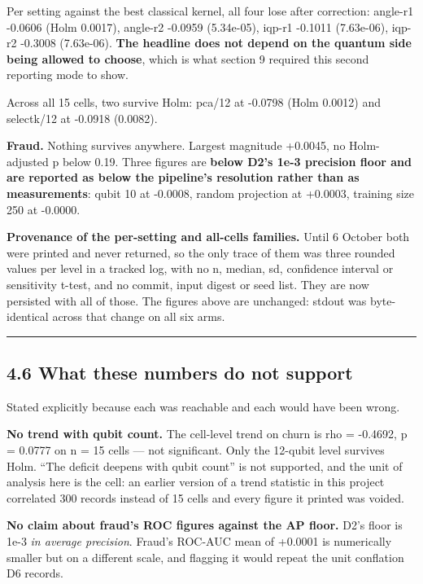 \documentclass[
  10pt,
]{article}
\begin{document}
Per setting against the best classical kernel, all four lose after
correction: angle-r1 -0.0606 (Holm 0.0017), angle-r2 -0.0959 (5.34e-05),
iqp-r1 -0.1011 (7.63e-06), iqp-r2 -0.3008 (7.63e-06). \textbf{The
headline does not depend on the quantum side being allowed to choose},
which is what section 9 required this second reporting mode to show.

Across all 15 cells, two survive Holm: pca/12 at -0.0798 (Holm 0.0012)
and selectk/12 at -0.0918 (0.0082).

\textbf{Fraud.} Nothing survives anywhere. Largest magnitude +0.0045, no
Holm-adjusted p below 0.19. Three figures are \textbf{below D2's 1e-3
precision floor and are reported as below the pipeline's resolution
rather than as measurements}: qubit 10 at -0.0008, random projection at
+0.0003, training size 250 at -0.0000.

\textbf{Provenance of the per-setting and all-cells families.} Until 6
October both were printed and never returned, so the only trace of them
was three rounded values per level in a tracked log, with no n, median,
sd, confidence interval or sensitivity t-test, and no commit, input
digest or seed list. They are now persisted with all of those. The
figures above are unchanged: stdout was byte-identical across that
change on all six arms.

\begin{center}\rule{0.5\linewidth}{0.5pt}\end{center}

\subsection{4.6 What these numbers do not
support}\label{what-these-numbers-do-not-support}

Stated explicitly because each was reachable and each would have been
wrong.

\textbf{No trend with qubit count.} The cell-level trend on churn is rho
= -0.4692, p = 0.0777 on n = 15 cells --- not significant. Only the
12-qubit level survives Holm. ``The deficit deepens with qubit count''
is not supported, and the unit of analysis here is the cell: an earlier
version of a trend statistic in this project correlated 300 records
instead of 15 cells and every figure it printed was voided.

\textbf{No claim about fraud's ROC figures against the AP floor.} D2's
floor is 1e-3 \emph{in average precision}. Fraud's ROC-AUC mean of
+0.0001 is numerically smaller but on a different scale, and flagging it
would repeat the unit conflation D6 records.
\end{document}

